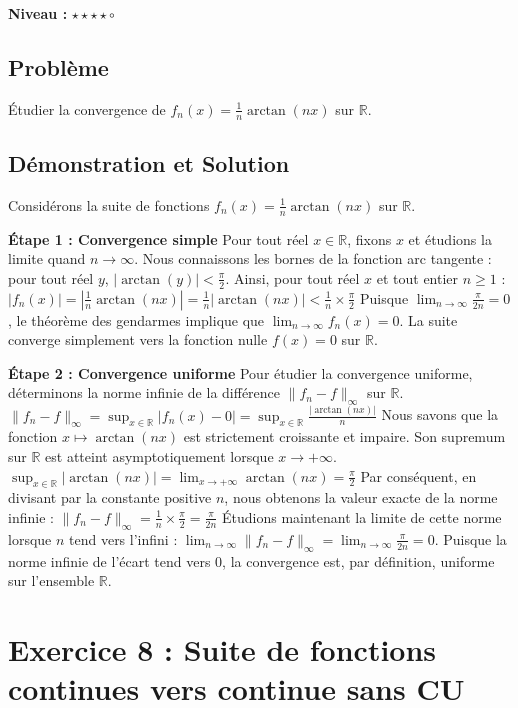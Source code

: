 \documentclass{report}
\begin{document}
\textbf{Niveau :} $\star \star \star \star \circ $

\section*{Problème}

Étudier la convergence de $f_n(x) = \frac{1}{n}\arctan(nx)$ sur $\mathbb{R}$.

\section*{Démonstration et Solution}

Considérons la suite de fonctions $f_n(x) = \frac{1}{n} \arctan(nx)$ sur $\mathbb{R}$.

\textbf{Étape 1 : Convergence simple}
Pour tout réel $x \in \mathbb{R}$, fixons $x$ et étudions la limite quand $n \to \infty$.
Nous connaissons les bornes de la fonction arc tangente : pour tout réel $y$, $|\arctan(y)| < \frac{\pi}{2}$.
Ainsi, pour tout réel $x$ et tout entier $n \geq 1$ :
$|f_n(x)| = \left| \frac{1}{n} \arctan(nx) \right| = \frac{1}{n} |\arctan(nx)| < \frac{1}{n} \times \frac{\pi}{2}$
Puisque $\lim_{n \to \infty} \frac{\pi}{2n} = 0$, le théorème des gendarmes implique que $\lim_{n \to \infty} f_n(x) = 0$.
La suite converge simplement vers la fonction nulle $f(x)=0$ sur $\mathbb{R}$.

\textbf{Étape 2 : Convergence uniforme}
Pour étudier la convergence uniforme, déterminons la norme infinie de la différence $\|f_n - f\|_\infty$ sur $\mathbb{R}$.
$\|f_n - f\|_\infty = \sup_{x \in \mathbb{R}} |f_n(x) - 0| = \sup_{x \in \mathbb{R}} \frac{|\arctan(nx)|}{n}$
Nous savons que la fonction $x \mapsto \arctan(nx)$ est strictement croissante et impaire. Son supremum sur $\mathbb{R}$ est atteint asymptotiquement lorsque $x \to +\infty$.
$\sup_{x \in \mathbb{R}} |\arctan(nx)| = \lim_{x \to +\infty} \arctan(nx) = \frac{\pi}{2}$
Par conséquent, en divisant par la constante positive $n$, nous obtenons la valeur exacte de la norme infinie :
$\|f_n - f\|_\infty = \frac{1}{n} \times \frac{\pi}{2} = \frac{\pi}{2n}$
Étudions maintenant la limite de cette norme lorsque $n$ tend vers l'infini :
$\lim_{n \to \infty} \|f_n - f\|_\infty = \lim_{n \to \infty} \frac{\pi}{2n} = 0$.
Puisque la norme infinie de l'écart tend vers 0, la convergence est, par définition, uniforme sur l'ensemble $\mathbb{R}$.

\newpage


\chapter*{Exercice 8 : Suite de fonctions continues vers continue sans CU}
\end{document}
